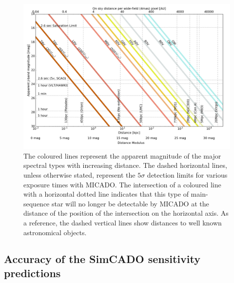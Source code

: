 \begin{figure}

    \centering
    \includegraphics[width=\textwidth]{images/spec_type_vs_dist_paper2_J}

    \caption{The coloured lines represent the apparent magnitude of the major spectral types with increasing distance. The dashed horizontal lines, unless otherwise stated, represent the $5\sigma$ detection limits for various exposure times with MICADO. The intersection of a coloured line with a horizontal dotted line indicates that this type of main-sequence star will no longer be detectable by MICADO at the distance of the position of the intersection on the horizontal axis. As a reference, the dashed vertical lines show distances to well known astronomical objects. 
    }
    
    \label{fig:MS_distances}
    
\end{figure}


\subsection{Accuracy of the SimCADO sensitivity predictions}

